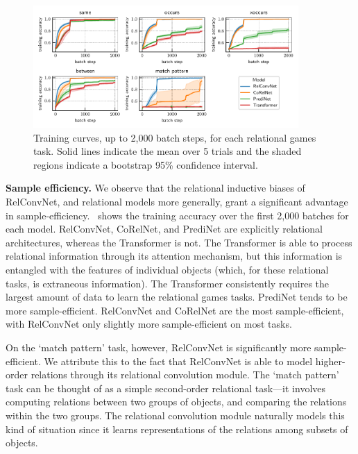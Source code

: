 \begin{figure}
    \centering
    \includegraphics[width=0.9\textwidth]{figs/experiments/all_training_curves.pdf}
    \vskip-5pt
    \caption{Training curves, up to 2,000 batch steps, for each relational games task. Solid lines indicate the mean over 5 trials and the shaded regions indicate a bootstrap 95\% confidence interval.}\label{fig:training_curves}
    \vskip-15pt
\end{figure}

\textbf{Sample efficiency.} We observe that the relational inductive biases of RelConvNet, and relational models more generally, grant a significant advantage in sample-efficiency.~ shows the training accuracy over the first 2,000 batches for each model. RelConvNet, CoRelNet, and PrediNet are explicitly relational architectures, whereas the Transformer is not. The Transformer is able to process relational information through its attention mechanism, but this information is entangled with the features of individual objects (which, for these relational tasks, is extraneous information). The Transformer consistently requires the largest amount of data to learn the relational games tasks. PrediNet tends to be more sample-efficient. RelConvNet and CoRelNet are the most sample-efficient, with RelConvNet only slightly more sample-efficient on most tasks.

On the `match pattern' task, however, RelConvNet is significantly more sample-efficient. We attribute this to the fact that RelConvNet is able to model higher-order relations through its relational convolution module. The `match pattern' task can be thought of as a simple second-order relational task---it involves computing relations between two groups of objects, and comparing the relations within the two groups. The relational convolution module naturally models this kind of situation since it learns representations of the relations among subsets of objects. %

